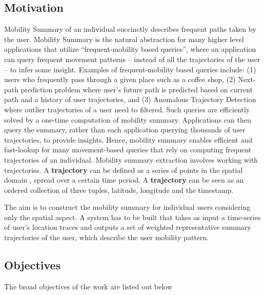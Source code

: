 \subsection{Motivation}
Mobility Summary of an individual succinctly describes frequent paths taken by the user. Mobility Summary is the natural abstraction for many higher level applications that utilize ``frequent-mobility based queries'', where an application can query frequent movement patterns -- instead of all the trajectories of the user -- to infer some insight.
Examples of frequent-mobility based queries include: (1) users who frequently pass through a given place such as a coffee shop, (2) Next-path prediction problem where user's future path is predicted based on current path and a history of user trajectories, and  (3) Anomalous Trajectory Detection where outlier trajectories of a user need to filtered. Such queries are efficiently solved by a one-time computation of mobility summary. Applications can then query the summary, rather than each application querying thousands of user trajectories, to provide insights. Hence, mobility summary enables efficient and fast-lookup for many movement-based queries that rely on computing frequent trajectories of an individual. Mobility summary extraction involves working with trajectories. A \textbf{trajectory} can be defined as a series of points in the spatial domain , spread over a certain time period. A \textbf{trajectory} can be seen as an ordered collection of three tuples, latitude, longitude and the timestamp. 

The aim is to construct the mobility summary for individual users considering only the spatial aspect. A system has to be built  that takes as input a time-series of user's location traces and outputs a set of weighted representative summary trajectories of the user, which describe the user mobility pattern. 
\subsection{Objectives}
The broad objectives of the work are listed out below

